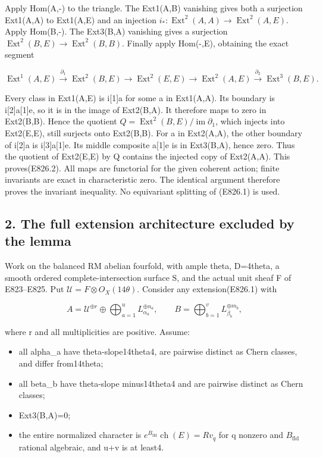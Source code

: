 Apply Hom(A,-) to the triangle. The Ext1(A,B) vanishing gives both a
surjection Ext1(A,A) to Ext1(A,E) and an injection
\(i_*:\operatorname{Ext}^2(A,A)\to\operatorname{Ext}^2(A,E)\). Apply
Hom(B,-). The Ext3(B,A) vanishing gives a surjection
\(\operatorname{Ext}^2(B,E)\to\operatorname{Ext}^2(B,B)\). Finally apply
Hom(-,E), obtaining the exact segment

\[
 \operatorname{Ext}^1(A,E)\xrightarrow{\partial_1}
 \operatorname{Ext}^2(B,E)\longrightarrow
 \operatorname{Ext}^2(E,E)\longrightarrow
 \operatorname{Ext}^2(A,E)\xrightarrow{\partial_2}
 \operatorname{Ext}^3(B,E).
 \tag{E826.3}
\]

Every class in Ext1(A,E) is i{[}1{]}a for some a in Ext1(A,A). Its boundary
is i{[}2{]}a{[}1{]}e, so it is in the image of Ext2(B,A). It therefore maps
to zero in Ext2(B,B). Hence the quotient
\(Q=\operatorname{Ext}^2(B,E)/\operatorname{im}\partial_1\), which injects
into Ext2(E,E), still surjects onto Ext2(B,B). For a in Ext2(A,A), the other
boundary of i{[}2{]}a is i{[}3{]}a{[}1{]}e. Its middle composite a{[}1{]}e
is in Ext3(B,A), hence zero. Thus the quotient of Ext2(E,E) by Q contains
the injected copy of Ext2(A,A). This proves(E826.2). All maps are functorial
for the given coherent action; finite invariants are exact in characteristic
zero. The identical argument therefore proves the invariant inequality. No
equivariant splitting of (E826.1) is used.

\subsection{2. The full extension architecture excluded by the
lemma}\label{SF-E826:the-full-extension-architecture-excluded-by-the-lemma}

Work on the balanced RM abelian fourfold, with ample theta, D=4theta, a
smooth ordered complete-intersection surface S, and the actual unit sheaf F
of E823--E825. Put \(\mathscr U=F\otimes O_X(14\theta)\). Consider any
extension(E826.1) with

\[
 A=\mathscr U^{\oplus r}\oplus\bigoplus_{a=1}^{u}L_{\alpha_a}^{\oplus n_a},
 \qquad
 B=\bigoplus_{b=1}^{v}L_{\beta_b}^{\oplus m_b},
 \tag{E826.4}
\]

where r and all multiplicities are positive. Assume:

\begin{itemize}
\tightlist
\item
  all alpha\_a have theta-slope14theta4, are pairwise distinct as Chern
  classes, and differ from14theta;
\item
  all beta\_b have theta-slope minus14theta4 and are pairwise distinct as
  Chern classes;
\item
  Ext3(B,A)=0;
\item
  the entire normalized character is
  \(e^{B_{\mathrm{fld}}}\operatorname{ch}(E)=R v_q\) for q nonzero and
  \(B_{\mathrm{fld}}\) rational algebraic, and u+v is at least4.
\end{itemize}


